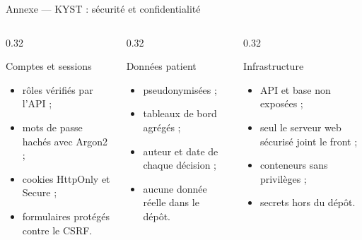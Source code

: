 \begin{frame}{Annexe --- KYST : sécurité et confidentialité}
  \scriptsize
  \begin{columns}[T,onlytextwidth]
    \begin{column}{0.32\textwidth}
      \begin{block}{Comptes et sessions}
        \begin{itemize}
          \item rôles vérifiés par l'API ;
          \item mots de passe hachés avec Argon2 ;
          \item cookies HttpOnly et Secure ;
          \item formulaires protégés contre le CSRF.
        \end{itemize}
      \end{block}
    \end{column}
    \begin{column}{0.32\textwidth}
      \begin{exampleblock}{Données patient}
        \begin{itemize}
          \item pseudonymisées ;
          \item tableaux de bord agrégés ;
          \item auteur et date de chaque décision ;
          \item aucune donnée réelle dans le dépôt.
        \end{itemize}
      \end{exampleblock}
    \end{column}
    \begin{column}{0.32\textwidth}
      \begin{alertblock}{Infrastructure}
        \begin{itemize}
          \item API et base non exposées ;
          \item seul le serveur web sécurisé joint le front ;
          \item conteneurs sans privilèges ;
          \item secrets hors du dépôt.
        \end{itemize}
      \end{alertblock}
    \end{column}
  \end{columns}
\end{frame}

